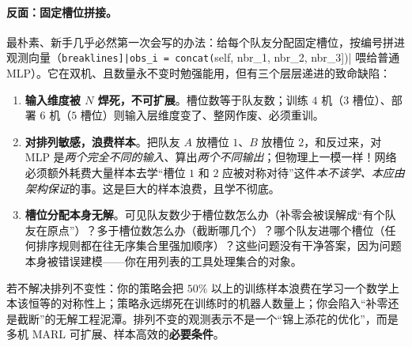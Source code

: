 \paragraph{反面：固定槽位拼接。}
最朴素、新手几乎必然第一次会写的办法：给每个队友分配固定槽位，按编号拼进观测向量（\Verb[breaklines]|obs_i = concat([self, nbr_1, nbr_2, nbr_3])| 喂给普通 MLP）。它在双机、且数量永不变时勉强能用，但有三个层层递进的致命缺陷：

\begin{enumerate}
  \item \textbf{输入维度被 $N$ 焊死，不可扩展}。槽位数等于队友数；训练 $4$ 机（$3$ 槽位）、部署 $6$ 机（$5$ 槽位）则输入层维度变了、整网作废、必须重训。
  \item \textbf{对排列敏感，浪费样本}。把队友 $A$ 放槽位 $1$、$B$ 放槽位 $2$，和反过来，对 MLP 是\emph{两个完全不同的输入}、算出\emph{两个不同输出}；但物理上一模一样！网络必须额外耗费大量样本去学“槽位 $1$ 和 $2$ 应被对称对待”这件\emph{本不该学、本应由架构保证}的事。这是巨大的样本浪费，且学不彻底。
  \item \textbf{槽位分配本身无解}。可见队友数少于槽位数怎么办（补零会被误解成“有个队友在原点”）？多于槽位数怎么办（截断哪几个）？哪个队友进哪个槽位（任何排序规则都在往无序集合里强加顺序）？这些问题没有干净答案，因为问题本身被错误建模——你在用列表的工具处理集合的对象。
\end{enumerate}

\begin{insight}
若不解决排列不变性：你的策略会把 $50\%$ 以上的训练样本浪费在学习一个数学上本该恒等的对称性上；策略永远绑死在训练时的机器人数量上；你会陷入“补零还是截断”的无解工程泥潭。排列不变的观测表示不是一个“锦上添花的优化”，而是多机 MARL 可扩展、样本高效的\textbf{必要条件}。
\end{insight}

